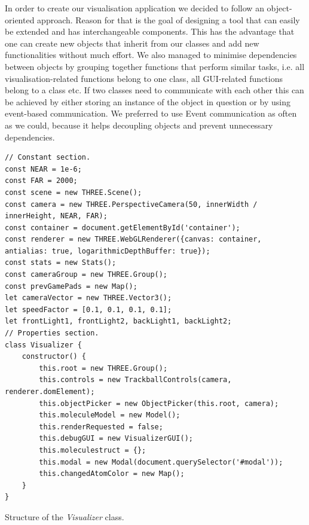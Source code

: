In order to create our visualisation application we decided to follow an object-oriented approach. Reason for that is the goal of designing a tool that can easily be extended and has interchangeable components. This has the advantage that one can create new objects that inherit from our classes and add new functionalities without much effort. We also managed to minimise dependencies between objects by grouping together functions that perform similar tasks, i.e. all visualisation-related functions belong to one class, all GUI-related functions belong to a class etc. If two classes need to communicate with each other this can be achieved by either storing an instance of the object in question or by using event-based communication. We preferred to use Event communication as often as we could, because it helps decoupling objects and prevent unnecessary dependencies.

\begin{listing}[H]
\begin{verbatim}
// Constant section.
const NEAR = 1e-6;
const FAR = 2000;
const scene = new THREE.Scene();
const camera = new THREE.PerspectiveCamera(50, innerWidth / innerHeight, NEAR, FAR);
const container = document.getElementById('container');
const renderer = new THREE.WebGLRenderer({canvas: container, antialias: true, logarithmicDepthBuffer: true});
const stats = new Stats();
const cameraGroup = new THREE.Group();
const prevGamePads = new Map();
let cameraVector = new THREE.Vector3();
let speedFactor = [0.1, 0.1, 0.1, 0.1];
let frontLight1, frontLight2, backLight1, backLight2;
// Properties section.
class Visualizer {
	constructor() {
		this.root = new THREE.Group();
		this.controls = new TrackballControls(camera, renderer.domElement);
		this.objectPicker = new ObjectPicker(this.root, camera);
		this.moleculeModel = new Model();
		this.renderRequested = false;
		this.debugGUI = new VisualizerGUI();
		this.moleculestruct = {};
		this.modal = new Modal(document.querySelector('#modal'));
		this.changedAtomColor = new Map();
	}
}	
\end{verbatim}
\caption{Structure of the \textit{Visualizer} class.}
\label{sec:implementation:overview:visualizer}
\end{listing}

